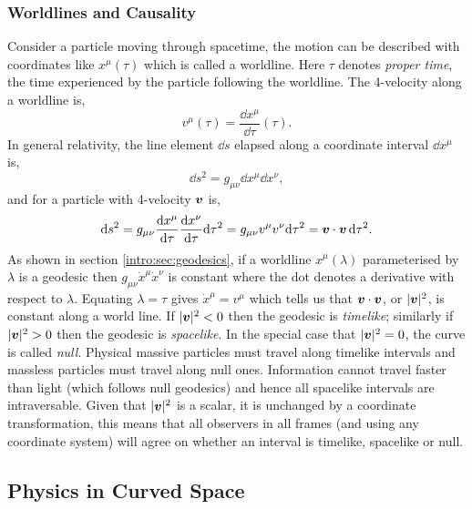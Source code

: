 \subsubsection{Worldlines and Causality}
Consider a particle moving through spacetime, the motion can be described with coordinates like $x^\mu(\tau)$ which is called a worldline. Here $\tau$ denotes {\it proper time}, the time experienced by the particle following the worldline. The 4-velocity along a worldline is, 
\begin{equation}
v^\mu(\tau) = \frac{\dd x^\mu}{\dd \tau}(\tau).
\end{equation}
In general relativity, the line element $\dd s$ elapsed along a coordinate interval $\dd x^\mu$ is,
\begin{equation}
\dd s ^2 = g_{\mu\nu}\dd x^\mu \dd x^\nu,
\end{equation}
and for a particle with 4-velocity $\boldsymbol{v}$ is,
\begin{equation}
\dd s ^2 = g_{\mu\nu} \frac{\dd x^\mu}{\dd \tau}  \frac{\dd x^\nu}{\dd \tau} \dd \tau^2 = g_{\mu\nu} v^\mu v^\nu \dd \tau^2 = \boldsymbol{v} \cdot \boldsymbol{v} \,\dd \tau^2. 
\end{equation}
As shown in section \ref{intro:sec:geodesics}, if a worldline $x^\mu(\lambda)$ parameterised by $\lambda$ is a geodesic then $g_{\mu\nu} \dot{x}^\mu \dot{x}^\nu$ is constant where the dot denotes a derivative with respect to $\lambda$. Equating $\lambda=\tau$ gives $\dot{x}^\mu = v^\mu$ which tells us that $\boldsymbol{v} \cdot \boldsymbol{v}$, or $|\boldsymbol{v}|^2$, is constant along a world line. If $|\boldsymbol{v}|^2<0$ then the geodesic is {\it timelike}; similarly if $|\boldsymbol{v}|^2>0$ then the geodesic is {\it spacelike}. In the special case that $|\boldsymbol{v}|^2=0$, the curve is called {\it null}. Physical massive particles must travel along timelike intervals and massless particles must travel along null ones. Information cannot travel faster than light (which follows null geodesics) and hence all spacelike intervals are intraversable. Given that $|\boldsymbol{v}|^2$ is a scalar, it is unchanged by a coordinate transformation, this means that all observers in all frames (and using any coordinate system) will agree on whether an interval is timelike, spacelike or null.



\subsection{Physics in Curved Space} \label{intro:sec:curvedspacephysics}

